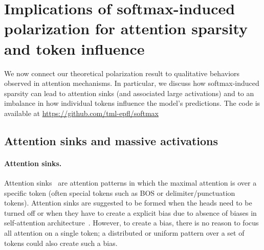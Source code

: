\documentclass{article}
\theoremstyle{plain}
\theoremstyle{definition}
\theoremstyle{remark}
\begin{document}
\section{Implications of softmax-induced polarization for attention sparsity and token influence}
\label{sec:implications}
We now connect our theoretical polarization result to qualitative behaviors observed in attention mechanisms. In particular, we discuss how softmax-induced sparsity can lead to attention sinks (and associated large activations) and to an imbalance in how individual tokens influence the model’s predictions. The code is available at \url{https://github.com/tml-epfl/softmax}



\subsection{Attention sinks and massive activations}
\paragraph{Attention sinks.} 
Attention sinks~\citep{xiao2024efficient} are attention patterns in which the maximal attention is over a specific token (often special tokens such as BOS or delimiter/punctuation tokens).
%
Attention sinks are suggested to be formed when the heads need to be turned off or when they have to create a explicit bias due to absence of biases in self-attention architecture~\citep{sun2024massive,zhang2025attention,gu2025when}. 
%
However, to create a bias, there is no reason to focus all attention on a single token; a distributed or uniform pattern over a set of tokens could also create such a bias.
%
%
\end{document}
